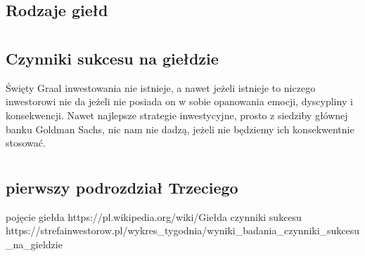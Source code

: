 \documentclass{report}
\begin{document}
\section {Rodzaje giełd}
\newpage
\chapter{}
\section{Czynniki sukcesu na giełdzie}
Święty Graal inwestowania nie istnieje, a nawet jeżeli istnieje to niczego inwestorowi nie da jeżeli nie posiada on w sobie opanowania emocji, dyscypliny i konsekwencji. Nawet najlepsze strategie inwestycyjne, prosto z siedziby głównej banku Goldman Sachs, nic nam nie dadzą, jeżeli nie będziemy ich konsekwentnie stosować.\cite{fib}
\newpage
\chapter{}
\section{pierwszy podrozdział Trzeciego}
\begin{thebibliography}{99}
pojęcie giełda
https://pl.wikipedia.org/wiki/Giełda
czynniki sukcesu
https://strefainwestorow.pl/wykres\_tygodnia/wyniki\_badania\_czynniki\_sukcesu\_na\_gieldzie
\end{thebibliography}
\end{document}
